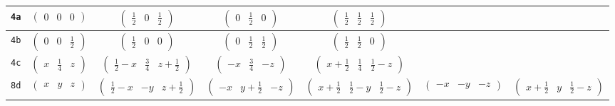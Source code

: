 \documentclass[fleqn,9pt,landscape]{jsarticle}
\begin{document}
\begin{center}
\begin{longtable}{ccccccc}
{\tt 4a} & $ \begin{pmatrix} 0 & 0 & 0 \end{pmatrix} $ & $ \begin{pmatrix} \frac{1}{2} & 0 & \frac{1}{2} \end{pmatrix} $ & $ \begin{pmatrix} 0 & \frac{1}{2} & 0 \end{pmatrix} $ & $ \begin{pmatrix} \frac{1}{2} & \frac{1}{2} & \frac{1}{2} \end{pmatrix} $ & $  $ & $  $ \\ \hline
{\tt 4b} & $ \begin{pmatrix} 0 & 0 & \frac{1}{2} \end{pmatrix} $ & $ \begin{pmatrix} \frac{1}{2} & 0 & 0 \end{pmatrix} $ & $ \begin{pmatrix} 0 & \frac{1}{2} & \frac{1}{2} \end{pmatrix} $ & $ \begin{pmatrix} \frac{1}{2} & \frac{1}{2} & 0 \end{pmatrix} $ & $  $ & $  $ \\ \hline
{\tt 4c} & $ \begin{pmatrix} x & \frac{1}{4} & z \end{pmatrix} $ & $ \begin{pmatrix} \frac{1}{2} - x & \frac{3}{4} & z + \frac{1}{2} \end{pmatrix} $ & $ \begin{pmatrix} - x & \frac{3}{4} & - z \end{pmatrix} $ & $ \begin{pmatrix} x + \frac{1}{2} & \frac{1}{4} & \frac{1}{2} - z \end{pmatrix} $ & $  $ & $  $ \\ \hline
{\tt 8d} & $ \begin{pmatrix} x & y & z \end{pmatrix} $ & $ \begin{pmatrix} \frac{1}{2} - x & - y & z + \frac{1}{2} \end{pmatrix} $ & $ \begin{pmatrix} - x & y + \frac{1}{2} & - z \end{pmatrix} $ & $ \begin{pmatrix} x + \frac{1}{2} & \frac{1}{2} - y & \frac{1}{2} - z \end{pmatrix} $ & $ \begin{pmatrix} - x & - y & - z \end{pmatrix} $ & $ \begin{pmatrix} x + \frac{1}{2} & y & \frac{1}{2} - z \end{pmatrix} $ \\

\end{longtable}
\end{center}
\end{document}
